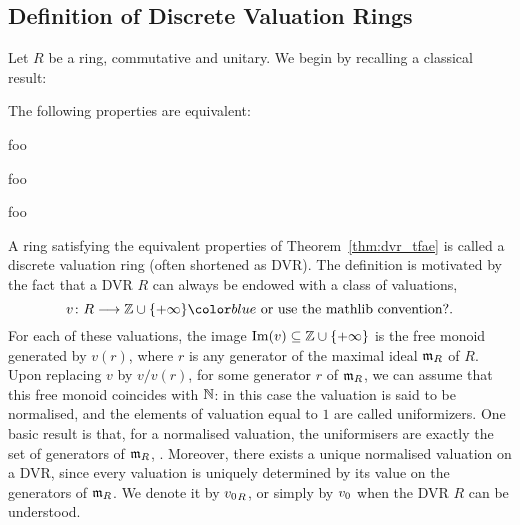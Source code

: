 \documentclass[sigplan,10pt,anonymous,review]{acmart}
\begin{document}
\subsection{Definition of Discrete Valuation Rings}\label{subsection:def_dvr}
Let $R$ be a ring,  commutative and unitary. We begin by recalling a classical result:
\begin{theorem}\label{thm:dvr_tfae}
The following properties are equivalent:
\begin{listResults}
\item foo
\item foo
\item foo
\end{listResults}
\end{theorem}
A ring satisfying the equivalent properties of Theorem~\ref{thm:dvr_tfae} is called a discrete valuation ring (often shortened as DVR). The definition is motivated by the fact that a DVR $R$ can always be endowed with a class of valuations, 
\[
v\colon R\longrightarrow \ZZ\cup\{+\infty\}\fil{\text{ or use the mathlib convention?}}.
\]
For each of these valuations, the image $\operatorname{Im}(v)\subseteq\mathbb{Z}\cup \{+\infty\}$ is the free monoid generated by $v(r)$, where $r$ is any generator of the maximal ideal $\mathfrak{m}_{R}$ of $R$. Upon replacing $v$ by $v/v(r)$, for some generator $r$ of $\mathfrak{m}_{R}$, we can assume that this free monoid coincides with $\mathbb{N}$: in this case the valuation is said to be normalised, and the elements of valuation equal to $1$ are called uniformizers. One basic result is that, for a normalised valuation, the uniformisers are exactly the set of generators of $\mathfrak{m}_{R}$, . Moreover, there exists a unique normalised valuation on a DVR, since every valuation is uniquely determined by its value on the generators of $\mathfrak{m}_{R}$. We denote it by ${{v}_{0}}_R$, or simply by ${v}_{0}$ when the DVR $R$ can be understood.
\end{document}

